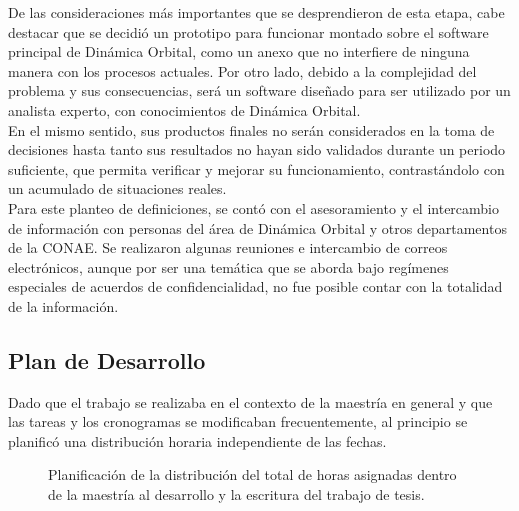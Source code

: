 De las consideraciones m\'as importantes que se desprendieron de esta etapa, cabe destacar que se decidi\'o un prototipo para funcionar montado sobre el software principal de Din\'amica Orbital, como un anexo que no interfiere de ninguna manera con los procesos actuales.
Por otro lado, debido a la complejidad del problema y sus consecuencias, ser\'a un software diseñado para ser utilizado por un analista experto, con conocimientos de Din\'amica Orbital.\\

En el mismo sentido, sus productos finales no ser\'an considerados en la toma de decisiones hasta tanto sus resultados no hayan sido validados durante un periodo suficiente, que permita verificar y mejorar su funcionamiento, contrast\'andolo con un acumulado de situaciones reales.\\

Para este planteo de definiciones, se cont\'o con el asesoramiento y el intercambio de informaci\'on con personas del \'area de Din\'amica Orbital y otros departamentos de la CONAE. Se realizaron algunas reuniones e intercambio de correos electr\'onicos, aunque por ser una tem\'atica que se aborda bajo reg\'imenes especiales de acuerdos de confidencialidad, no fue posible contar con la totalidad de la informaci\'on.

\subsection{Plan de Desarrollo}

Dado que el trabajo se realizaba en el contexto de la maestr\'ia en general y que las tareas y los cronogramas se modificaban frecuentemente, al principio se planific\'o una distribuci\'on horaria independiente de las fechas.

\begin{figure}[h!]
  \centering
  \caption{Planificaci\'on de la distribuci\'on del total de horas asignadas dentro de la maestr\'ia al desarrollo y la escritura del trabajo de tesis.}
  \label{fig:actdiag}
\end{figure}

